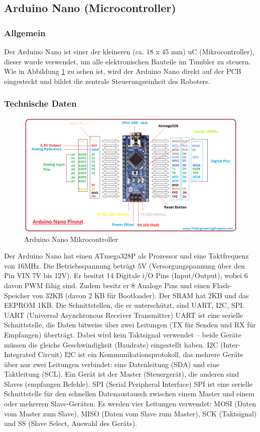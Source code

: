 \subsection{Arduino Nano (Microcontroller)}
%
\subsubsection{Allgemein}
Der Arduino Nano ist einer der kleineren (ca. 18 x 45 mm) uC (Mikrocontroller),
dieser wurde verwendet, um alle elektronischen Bauteile im Tumbler zu steuern.
%
Wie in Abbildung \ref{fig:arduino_nano} zu sehen ist,
wird der Arduino Nano direkt auf der PCB eingesteckt und bildet die zentrale Steuerungseinheit des Roboters.
\subsubsection{Technische Daten}
\begin{figure}[H]
    \centering
    \includegraphics[width=1\textwidth]{img/Hardware/arduino_nano.png}
    \caption{Arduino Nano Mikrocontroller}
    \label{fig:arduino_nano}
\end{figure}
Der Arduino Nano hat einen ATmega328P als Prozessor und eine Taktfrequenz von 16MHz.
%
Die Betriebsspannung beträgt 5V (Versorgungspannung über den Pin VIN 7V bis 12V). 
Er besitzt 14 Digitale i/O Pins (Input/Output),
wobei 6 davon PWM fähig sind.
%
Zudem besitz er 8 Analoge Pins und einen Flash-Speicher von 32KB (davon 2 KB für Bootloader). 
%
Der SRAM hat 2KB und das EEPROM 1KB. Die Schnittstellen, die er unterschützt, sind UART, I2C, SPI.
%
UART (Universal Asynchronous Receiver Transmitter)
UART ist eine serielle Schnittstelle, die Daten bitweise über zwei Leitungen (TX für Senden und RX für Empfangen) überträgt.
%
Dabei wird kein Taktsignal verwendet -- beide Geräte müssen die gleiche Geschwindigkeit (Baudrate) eingestellt haben.
%
I2C (Inter-Integrated Circuit)
I2C ist ein Kommunikationsprotokoll,
das mehrere Geräte über nur zwei Leitungen verbindet:
eine Datenleitung (SDA) und eine Taktleitung (SCL).
%
Ein Gerät ist der Master (Steuergerät), die anderen sind Slaves (empfangen Befehle).
%
SPI (Serial Peripheral Interface)
SPI ist eine serielle Schnittstelle für den schnellen Datenaustausch zwischen einem Master und einem oder mehreren Slave-Geräten.
%
Es werden vier Leitungen verwendet:
MOSI (Daten vom Master zum Slave),
MISO (Daten vom Slave zum Master),
SCK (Taktsignal)
und SS (Slave Select, Auswahl des Geräts).
